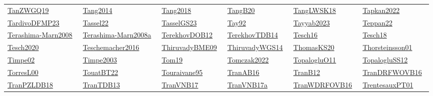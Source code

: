 \begin{longtable}{*{6}{l}}
\href{../works/TanZWGQ19.pdf}{TanZWGQ19}~\cite{TanZWGQ19} & \href{../}{Tang2014}~\cite{Tang2014} & \href{../}{Tang2018}~\cite{Tang2018} & \href{../works/TangB20.pdf}{TangB20}~\cite{TangB20} & \href{../works/TangLWSK18.pdf}{TangLWSK18}~\cite{TangLWSK18} & \href{../}{Tapkan2022}~\cite{Tapkan2022}\\ 
\href{../works/TardivoDFMP23.pdf}{TardivoDFMP23}~\cite{TardivoDFMP23} & \href{../works/Tassel22.pdf}{Tassel22}~\cite{Tassel22} & \href{../works/TasselGS23.pdf}{TasselGS23}~\cite{TasselGS23} & \href{../}{Tay92}~\cite{Tay92} & \href{../}{Tayyab2023}~\cite{Tayyab2023} & \href{../works/Teppan22.pdf}{Teppan22}~\cite{Teppan22}\\ 
\href{../}{Terashima-Marn2008}~\cite{Terashima-Marn2008} & \href{../}{Terashima-Marn2008a}~\cite{Terashima-Marn2008a} & \href{../works/TerekhovDOB12.pdf}{TerekhovDOB12}~\cite{TerekhovDOB12} & \href{../works/TerekhovTDB14.pdf}{TerekhovTDB14}~\cite{TerekhovTDB14} & \href{../works/Tesch16.pdf}{Tesch16}~\cite{Tesch16} & \href{../works/Tesch18.pdf}{Tesch18}~\cite{Tesch18}\\ 
\href{../}{Tesch2020}~\cite{Tesch2020} & \href{../}{Teschemacher2016}~\cite{Teschemacher2016} & \href{../works/ThiruvadyBME09.pdf}{ThiruvadyBME09}~\cite{ThiruvadyBME09} & \href{../works/ThiruvadyWGS14.pdf}{ThiruvadyWGS14}~\cite{ThiruvadyWGS14} & \href{../works/ThomasKS20.pdf}{ThomasKS20}~\cite{ThomasKS20} & \href{../works/Thorsteinsson01.pdf}{Thorsteinsson01}~\cite{Thorsteinsson01}\\ 
\href{../works/Timpe02.pdf}{Timpe02}~\cite{Timpe02} & \href{../}{Timpe2003}~\cite{Timpe2003} & \href{../works/Tom19.pdf}{Tom19}~\cite{Tom19} & \href{../}{Tomczak2022}~\cite{Tomczak2022} & \href{../works/TopalogluO11.pdf}{TopalogluO11}~\cite{TopalogluO11} & \href{../works/TopalogluSS12.pdf}{TopalogluSS12}~\cite{TopalogluSS12}\\ 
\href{../works/TorresL00.pdf}{TorresL00}~\cite{TorresL00} & \href{../works/TouatBT22.pdf}{TouatBT22}~\cite{TouatBT22} & \href{../works/Touraivane95.pdf}{Touraivane95}~\cite{Touraivane95} & \href{../works/TranAB16.pdf}{TranAB16}~\cite{TranAB16} & \href{../works/TranB12.pdf}{TranB12}~\cite{TranB12} & \href{../works/TranDRFWOVB16.pdf}{TranDRFWOVB16}~\cite{TranDRFWOVB16}\\ 
\href{../works/TranPZLDB18.pdf}{TranPZLDB18}~\cite{TranPZLDB18} & \href{../works/TranTDB13.pdf}{TranTDB13}~\cite{TranTDB13} & \href{../works/TranVNB17.pdf}{TranVNB17}~\cite{TranVNB17} & \href{../works/TranVNB17a.pdf}{TranVNB17a}~\cite{TranVNB17a} & \href{../works/TranWDRFOVB16.pdf}{TranWDRFOVB16}~\cite{TranWDRFOVB16} & \href{../works/TrentesauxPT01.pdf}{TrentesauxPT01}~\cite{TrentesauxPT01}\\ 

\end{longtable}
